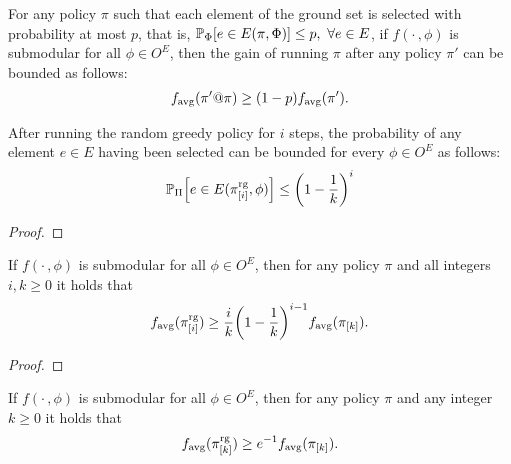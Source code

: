 \begin{cor}
  For any policy $\pi$ such that each element of the ground set is selected with probability at most $p$, that is, $\P[\Phi]{e \in E(\pi, \Phi)} \leq p,\ \forall e \in E$, if $f(\cdot\,, \phi)$ is submodular for all $\phi \in O^E$, then the gain of running $\pi$ after any policy $\pi'$ can be bounded as follows:
\begin{align*}
  f_{\mathrm{avg}}(\pi' @ \pi) \geq (1-p)f_{\mathrm{avg}}(\pi').
\end{align*}
\end{cor}

\begin{lemma}
  After running the random greedy policy for $i$ steps, the probability of any element $e \in E$ having been selected can be bounded for every $\phi \in O^E$ as follows:
\begin{align*}
  \P[\Pi]{e \in E(\pigi, \phi)} \leq \left(1 - \frac{1}{k}\right)^i
\end{align*}
\end{lemma}
\begin{proof}
\end{proof}

\begin{theorem}
  If $f(\cdot\,, \phi)$ is submodular for all $\phi \in O^E$, then for any policy $\pi$ and all integers $i, k \geq 0$ it holds that
  \begin{align*}
    \favg(\pigi) \geq \frac{i}{k}\left(1 - \frac{1}{k}\right)^{i-1}\favg(\pik).
  \end{align*}
\end{theorem}
\begin{proof}
\end{proof}

\begin{cor}
  If $f(\cdot\,, \phi)$ is submodular for all $\phi \in O^E$, then for any policy $\pi$ and any integer $k \geq 0$ it holds that
  \begin{align*}
    f_{\mathrm{avg}}(\pi^{\textrm{rg}}_{[k]}) \geq e^{-1}f_{\mathrm{avg}}(\pi_{[k]}).
  \end{align*}
\end{cor}
